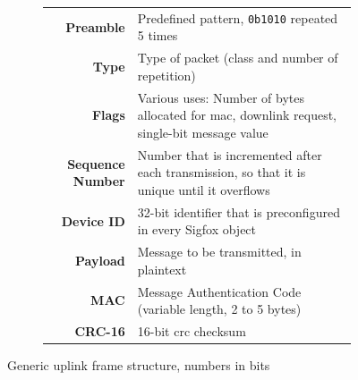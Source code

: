 \begin{figure}[h]
\begin{subfigure}[c]{1.0\textwidth}
\end{subfigure}
\begin{subfigure}[c]{1.0\textwidth}
	\centering
	\begin{tabular}{r p{10cm}}
		\textbf{Preamble} & Predefined pattern, \texttt{0b1010} repeated 5 times \\
		\textbf{Type} & Type of packet (class and number of repetition) \\
		\textbf{Flags} & Various uses: Number of bytes allocated for \gls{mac}, downlink request, single-bit message value \\
		\textbf{Sequence Number} & Number that is incremented after each transmission, so that it is unique until it overflows \\
		\textbf{Device ID} & 32-bit identifier that is preconfigured in every Sigfox object \\
		\textbf{Payload} & Message to be transmitted, in plaintext \\
		\textbf{MAC} & Message Authentication Code (variable length, 2 to 5 bytes) \\
		\textbf{CRC-16} & 16-bit \gls{crc} checksum
	\end{tabular}
\end{subfigure}
	\caption{Generic uplink frame structure, numbers in bits}
	\label{fig:uplinkframe_general}
\end{figure}


